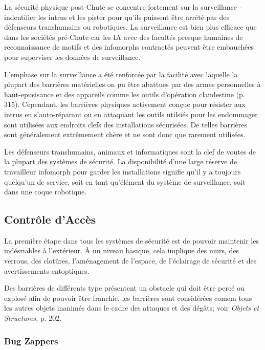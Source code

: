 La sécurité physique post-Chute se concentre fortement sur la surveillance - indentifier les intrus et les pister pour qu'ils puissent être arrété par des défenseurs transhumains ou robotiques. La surveillance est bien plus efficace que dans les sociétés pré-Chute car les IA avec des facultés presque humaines de reconnaissance de motifs et des infomorphs contractés peuvent être embauchées pour superviser les données de surveillance. 

L'emphase sur la surveillance a été renforcée par la facilité avec laquelle la plupart des barrières matérielles on pu être abattues par des armes personnelles à haut-epusisance et des appareils comme les outils d'opération clandestine (p. 315). Cependant, les barrières physiques activement conçue pour résister aux intrus en s'auto-réparant ou en attaquant les outils utilsiés pour les endommager sont utilisées aux endroits clefs des installations sécurisées. De telles barrières sont généralement extrêmement chère et ne sont donc que rarement utilisées. 

Les défenseurs transhumains, animaux et informatiques sont la clef de voutes de la plupart des systèmes de sécurité. La disponibilité d'une large réserve de travailleur infomorph pour garder les installations signifie qu'il y a toujours quelqu'un de service, soit en tant qu'élément du système de surveillance, soit dans une coque robotique. 

\subsection{Contrôle d'Accès} 

La première étape dans tous les systèmes de sécurité est de pouvoir maintenir les indésriables à l'extérieur. À un niveau basique, cela implique des murs, des verrous, des clotûres, l'aménagement de l'espace, de l'éclairage de sécurité et des avertissements entoptiques. 

Des barrières de différents type présentent un obstacle qui doit être percé ou explosé afin de pouvoir être franchie. les barrières  sont considérées comem tous les autres objets inanimés dans le cadre des attaques et des dégâts; voir \textit{Objets et Structures,}\textit{} p. 202. 

\subsubsection{Bug Zappers} 

